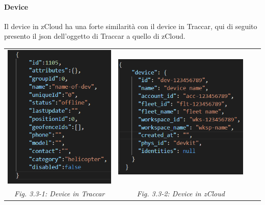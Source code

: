 \documentclass[a4paper,titlepage,12pt]{book}
\begin{document}
{\paragraph{
Device}
Il device in zCloud ha una forte similarità con il device in Traccar, qui di seguito presento il json dell'oggetto di Traccar a quello di zCloud.\\



\begin{center}

\begin{tabular}{c c c c}

    \includegraphics[scale=0.8]{images/traccDev.png}


 &  
\includegraphics[scale=0.6]{images/zClDev.png} \\
\textit{Fig. 3.3-1: Device in Traccar} &  \textit{Fig. 3.3-2: Device in zCloud}
\end{tabular}
\end{center}\par\medskip


}
\end{document}
